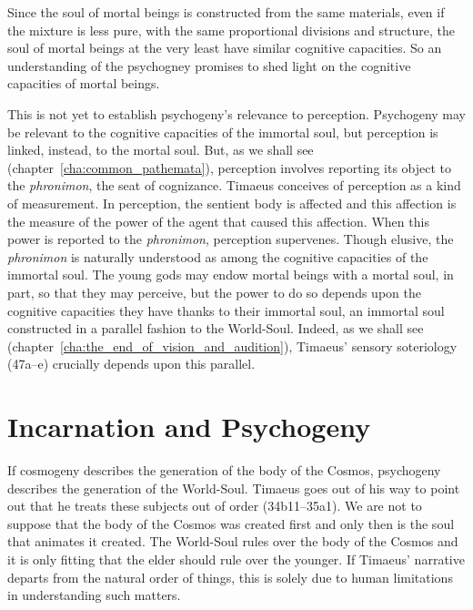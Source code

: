 Since the soul of mortal beings is constructed from the same materials, even if the mixture is less pure, with the same proportional divisions and structure, the soul of mortal beings at the very least have similar cognitive capacities. So an understanding of the psychogney promises to shed light on the cognitive capacities of mortal beings.

This is not yet to establish psychogeny's relevance to perception. Psychogeny may be relevant to the cognitive capacities of the immortal soul, but perception is linked, instead, to the mortal soul. But, as we shall see (chapter~\ref{cha:common_pathemata}), perception involves reporting its object to the \emph{phronimon}, the seat of cognizance. Timaeus conceives of perception as a kind of measurement. In perception, the sentient body is affected and this affection is the measure of the power of the agent that caused this affection. When this power is reported to the \emph{phronimon}, perception supervenes. Though elusive, the \emph{phronimon} is naturally understood as among the cognitive capacities of the immortal soul. The young gods may endow mortal beings with a mortal soul, in part, so that they may perceive, but the power to do so depends upon the cognitive capacities they have thanks to their immortal soul, an immortal soul constructed in a parallel fashion to the World-Soul. Indeed, as we shall see (chapter~\ref{cha:the_end_of_vision_and_audition}), Timaeus' sensory soteriology (47a--e) crucially depends upon this parallel.



\section{Incarnation and Psychogeny} %
\label{sec:embodiment_and_psychogeny}

If cosmogeny describes the generation of the body of the Cosmos, psychogeny describes the generation of the World-Soul. Timaeus goes out of his way to point out that he treats these subjects out of order (34b11--35a1). We are not to suppose that the body of the Cosmos was created first and only then is the soul that animates it created. The World-Soul rules over the body of the Cosmos and it is only fitting that the elder should rule over the younger. If Timaeus' narrative departs from the natural order of things, this is solely due to human limitations in understanding such matters.

